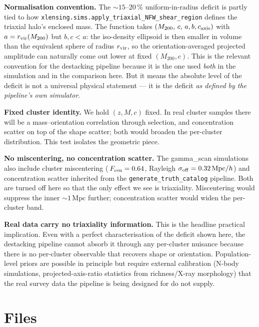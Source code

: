 \documentclass[11pt,a4paper]{article}
\newcommand{\Mpc}{\,\mathrm{Mpc}}
\begin{document}
\textbf{Normalisation convention.}\quad
The $\sim 15$--$20\,\%$ uniform-in-radius deficit
is partly tied to how \texttt{xlensing.sims.apply\_triaxial\_NFW\_shear\_region}
defines the triaxial halo's enclosed mass.  The function takes
$(M_{200},\,c,\,a,b,c_{\rm axis})$ with $a=r_{\rm vir}(M_{200})$ but $b,c<a$:
the iso-density ellipsoid is then smaller in volume than the equivalent
sphere of radius $r_{\rm vir}$, so the orientation-averaged projected
amplitude can naturally come out lower at fixed $(M_{200},c)$.  This is the
relevant convention for the destacking pipeline because it is the one used
\emph{both} in the simulation and in the comparison here.  But it means the
absolute level of the deficit is not a universal physical statement --- it
is the deficit \emph{as defined by the pipeline's own simulator}.

\textbf{Fixed cluster identity.}\quad
We hold $(z,M,c)$ fixed.  In real cluster samples there will be a
mass--orientation correlation through selection, and concentration scatter
on top of the shape scatter; both would broaden the per-cluster
distribution.  This test isolates the geometric piece.

\textbf{No miscentering, no concentration scatter.}\quad
The gamma\_scan simulations also include cluster miscentering (\,$F_{\rm
cen}=0.64$, Rayleigh $\sigma_{\rm off}=0.32\,\mathrm{Mpc}/h$) and concentration
scatter inherited from the \texttt{generate\_truth\_catalog} pipeline.  Both
are turned off here so that the only effect we see is triaxiality.
Miscentering would suppress the inner $\sim 1\Mpc$ further; concentration
scatter would widen the per-cluster band.

\textbf{Real data carry no triaxiality information.}\quad
This is the headline practical implication.  Even with a perfect
characterisation of the deficit shown here, the destacking pipeline cannot
absorb it through any per-cluster nuisance because there is no per-cluster
observable that recovers shape or orientation.  Population-level priors are
possible in principle but require external calibration (N-body simulations,
projected-axis-ratio statistics from richness/X-ray morphology) that the
real survey data the pipeline is being designed for do not supply.

\section*{Files}
\end{document}
